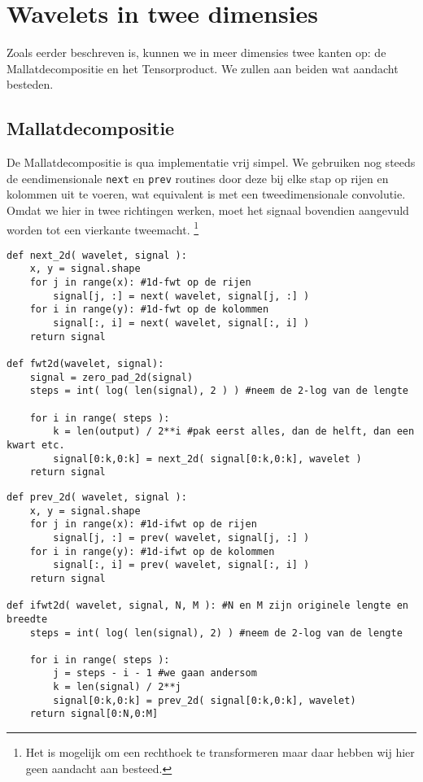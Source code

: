\section{Wavelets in twee dimensies}
Zoals eerder beschreven is, kunnen we in meer dimensies twee kanten op: de Mallatdecompositie en het Tensorproduct.
We zullen aan beiden wat aandacht besteden.

\subsection{Mallatdecompositie}
De Mallatdecompositie is qua implementatie vrij simpel. 
We gebruiken nog steeds de eendimensionale \texttt{next} en \texttt{prev} routines 
door deze bij elke stap op rijen en kolommen uit te voeren, wat equivalent is met een tweedimensionale convolutie.
Omdat we hier in twee richtingen werken, moet het signaal bovendien aangevuld worden tot een vierkante tweemacht.
\footnote{Het is mogelijk om een rechthoek te transformeren maar daar hebben wij hier geen aandacht aan besteed.}

\begin{lstlisting}[caption=De Mallatdecompositie in 2 dimensies]
def next_2d( wavelet, signal ):
	x, y = signal.shape
	for j in range(x): #1d-fwt op de rijen
		signal[j, :] = next( wavelet, signal[j, :] )
	for i in range(y): #1d-fwt op de kolommen
		signal[:, i] = next( wavelet, signal[:, i] )
	return signal

def fwt2d(wavelet, signal):
	signal = zero_pad_2d(signal)
	steps = int( log( len(signal), 2 ) ) #neem de 2-log van de lengte
	
	for i in range( steps ):
		k = len(output) / 2**i #pak eerst alles, dan de helft, dan een kwart etc.
		signal[0:k,0:k] = next_2d( signal[0:k,0:k], wavelet )
	return signal
\end{lstlisting}
\begin{lstlisting}[caption=De omgekeerde Mallatdecompositie in 2 dimensies]
def prev_2d( wavelet, signal ):
	x, y = signal.shape
	for j in range(x): #1d-ifwt op de rijen
		signal[j, :] = prev( wavelet, signal[j, :] )
	for i in range(y): #1d-ifwt op de kolommen
		signal[:, i] = prev( wavelet, signal[:, i] )
	return signal

def ifwt2d( wavelet, signal, N, M ): #N en M zijn originele lengte en breedte
	steps = int( log( len(signal), 2) ) #neem de 2-log van de lengte
	
	for i in range( steps ):
		j = steps - i - 1 #we gaan andersom
		k = len(signal) / 2**j
		signal[0:k,0:k] = prev_2d( signal[0:k,0:k], wavelet)
	return signal[0:N,0:M]
\end{lstlisting}


